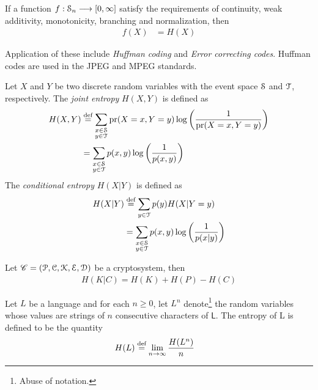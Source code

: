 \documentclass[a4paper, 12pt]{book} %
\begin{document}
\begin{proposition}
If a function $f: \EuScript{S}_n \longrightarrow [0, \infty]$ satisfy the requirements of continuity, weak additivity, monotonicity, branching and normalization, then
\begin{align}
    f(X) &= H(X)
\end{align}
\end{proposition}

Application of these include \emph{Huffman coding} and \emph{Error correcting codes}. Huffman codes are used in the JPEG and MPEG standards.


\begin{definition}
    Let $X$ and $Y$ be two discrete random variables with the event space $\EuScript{S}$ and $\EuScript{T}$, respectively. The \emph{joint entropy} $H(X, Y)$ is defined as
    \begin{align}
        H(X, Y) &\overset{\text{def}}{=} \sum_{ \substack{x \in \EuScript{S} \\ y \in \EuScript{T}}} \operatorname{pr}(X = x, Y = y) \log\bigg( \frac{1}{\operatorname{pr}(X = x, Y = y)}\bigg) \\
        &= \sum_{ \substack{x \in \EuScript{S} \\ y \in \EuScript{T}}} p(x, y) \log \bigg( \frac{1}{p(x, y)}\bigg)
    \end{align}
    The \emph{conditional entropy} $H(X|Y)$ is defined as 
    \begin{align}
        H(X|Y) &\overset{\text{def}}{=} \sum_{y \in \EuScript{T}} p(y)H(X|Y=y) \\
        &= \sum_{\substack{x \in \EuScript{S} \\ y \in \EuScript{T}}} p(x, y) \log \bigg( \frac{1}{p(x|y)}\bigg)
    \end{align}
\end{definition}


\begin{theorem}
    Let $\mathscr{C} = (\EuScript{P}, \EuScript{C}, \EuScript{K}, \EuScript{E}, \EuScript{D})$ be a cryptosystem, then 
    \begin{align}
        H(K|C) = H(K) + H(P) - H(C)
    \end{align}
\end{theorem}


\begin{definition}
    Let $L$ be a language and for each $n \geq 0$, let $L^n$ denote\footnote{Abuse of notation.} the random variables whose values are strings of $n$ consecutive characters of $\mathsf{L}$. The entropy of L is defined to be the quantity
\begin{align}
    H(L) &\overset{\text{def}}{=} \lim_{n \rightarrow \infty} \frac{H(L^n)}{n}
\end{align}
\cite{silverman2008introduction}
\end{definition}
\end{document}
